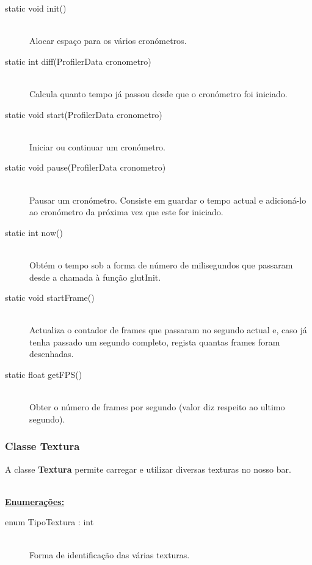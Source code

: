 \documentclass[a5paper,onecolumn, 11pt]{article}
\begin{document}
\begin{description}
	\item[static void init()] \hfill \\
	Alocar espaço para os vários cronómetros.

	\item[static int diff(ProfilerData cronometro)] \hfill \\
	Calcula quanto tempo já passou desde que o cronómetro foi iniciado.

	\item[static void start(ProfilerData cronometro)] \hfill \\
	Iniciar ou continuar um cronómetro.

	\item[static void pause(ProfilerData cronometro)] \hfill \\
	Pausar um cronómetro. Consiste em guardar o tempo actual e adicioná-lo ao cronómetro da próxima vez que este for iniciado.

	\item[static int now()] \hfill \\
	Obtém o tempo sob a forma de número de milisegundos que passaram desde a chamada à função glutInit.

	\item[static void startFrame()] \hfill \\
	Actualiza o contador de frames que passaram no segundo actual e, caso já tenha passado um segundo completo, regista quantas frames foram desenhadas.

	\item[static float getFPS()] \hfill \\
	Obter o número de frames por segundo (valor diz respeito ao ultimo segundo).
\end{description}

\clearpage
\subsubsection{Classe Textura} \label{clsse textura}
A classe \textbf{Textura} permite carregar e utilizar diversas texturas no nosso bar.

\hfill \\ \underline{\textbf{Enumerações:}}

\begin{description}
	\item[enum TipoTextura : int] \hfill \\
	Forma de identificação das várias texturas.
\end{description}
\end{document}
